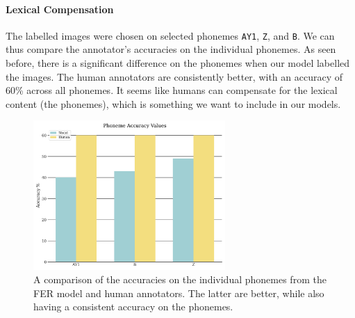 \paragraph{Lexical Compensation}
The labelled images were chosen on selected phonemes \texttt{AY1}, \texttt{Z}, and \texttt{B}. We can thus compare the annotator's accuracies on the individual phonemes. As seen before, there is a significant difference on the phonemes when our model labelled the images. The human annotators are consistently better, with an accuracy of 60\% across all phonemes. It seems like humans can compensate for the lexical content (the phonemes), which is something we want to include in our models.

\begin{figure}
    \centering
    \includegraphics[width=0.65\textwidth]{res/Phone_model_acc.png}
    \caption{A comparison of the accuracies on the individual phonemes from the FER model and human annotators. The latter are better, while also having a consistent accuracy on the phonemes.}
    \label{fig:phone_model_human}
\end{figure}